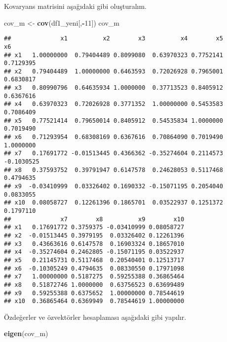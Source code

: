 \documentclass[
]{book}
\newenvironment{Shaded}{\begin{snugshade}}{\end{snugshade}}
\newcommand{\DecValTok}[1]{\textcolor[rgb]{0.00,0.00,0.81}{#1}}
\newcommand{\KeywordTok}[1]{\textcolor[rgb]{0.13,0.29,0.53}{\textbf{#1}}}
\newcommand{\NormalTok}[1]{#1}
\newcommand{\OperatorTok}[1]{\textcolor[rgb]{0.81,0.36,0.00}{\textbf{#1}}}
\newcommand{\StringTok}[1]{\textcolor[rgb]{0.31,0.60,0.02}{#1}}
\begin{document}
Kovaryans matrisini aşağıdaki gibi oluşturalım.

\begin{Shaded}
\begin{Highlighting}[]
\NormalTok{cov_m <-}\StringTok{ }\KeywordTok{cov}\NormalTok{(df1_yeni[,}\OperatorTok{-}\DecValTok{11}\NormalTok{])}
\NormalTok{cov_m}
\end{Highlighting}
\end{Shaded}

\begin{verbatim}
##              x1          x2        x3          x4        x5         x6
## x1   1.00000000  0.79404489 0.8099080  0.63970323 0.7752141  0.7129395
## x2   0.79404489  1.00000000 0.6463593  0.72026928 0.7965001  0.6830817
## x3   0.80990796  0.64635934 1.0000000  0.37713523 0.8405912  0.6367616
## x4   0.63970323  0.72026928 0.3771352  1.00000000 0.5453583  0.7086409
## x5   0.77521414  0.79650014 0.8405912  0.54535834 1.0000000  0.7019490
## x6   0.71293954  0.68308169 0.6367616  0.70864090 0.7019490  1.0000000
## x7   0.17691772 -0.01513445 0.4366362 -0.35274604 0.2114573 -0.1030525
## x8   0.37593752  0.39791947 0.6147578  0.24628053 0.5117468  0.4794635
## x9  -0.03410999  0.03326402 0.1690332 -0.15071195 0.2054040  0.0833055
## x10  0.08058727  0.12261396 0.1865701  0.03522937 0.1251372  0.1797110
##              x7        x8          x9        x10
## x1   0.17691772 0.3759375 -0.03410999 0.08058727
## x2  -0.01513445 0.3979195  0.03326402 0.12261396
## x3   0.43663616 0.6147578  0.16903324 0.18657010
## x4  -0.35274604 0.2462805 -0.15071195 0.03522937
## x5   0.21145731 0.5117468  0.20540401 0.12513717
## x6  -0.10305249 0.4794635  0.08330550 0.17971098
## x7   1.00000000 0.5187275  0.59255388 0.36865464
## x8   0.51872746 1.0000000  0.63756523 0.63699489
## x9   0.59255388 0.6375652  1.00000000 0.78544619
## x10  0.36865464 0.6369949  0.78544619 1.00000000
\end{verbatim}

Özdeğerler ve özvektörler hesaplaması aşağıdaki gibi yapılır.

\begin{Shaded}
\begin{Highlighting}[]
\KeywordTok{eigen}\NormalTok{(cov_m)}
\end{Highlighting}
\end{Shaded}
\end{document}
